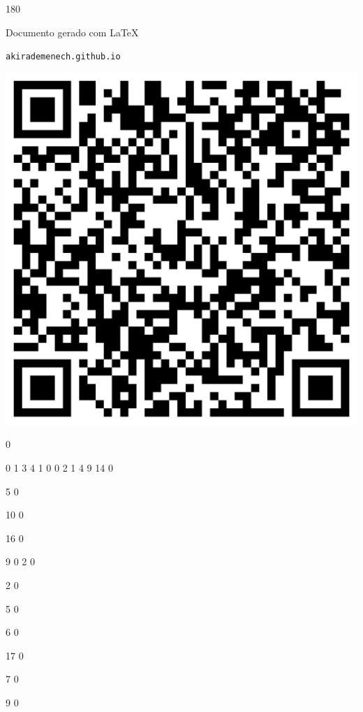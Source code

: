 \documentclass[12pt]{article}
\begin{document}
	\begin{turn}{180}	
		\begin{minipage}{\textwidth}		  
		  Documento gerado com \LaTeX			
		  
		  \texttt{akirademenech.github.io}

		  \includegraphics[height=0.3\textheight]{2e-2.pdf}

		\end{minipage}	
	\end{turn}  
		  
		\vfill  
		  
{
	0	%

	0	%
	1	%
	3	%
	4	%
	1	%
	0	%
	0	%
	2	%
	1	%
	4	%
	9	%
	14	%
	0	%

	5	%
	0	%

	10	%
	0	%

	16	%
	0	%

	9	%
	0	%
	2	%
	0	%

	2	%
	0	%

	5	%
	0	%

	6	%
	0	%

	17	%
	0	%

	7	%
	0	%

	9	%
	0	%

}	  
		    	
\end{document}
